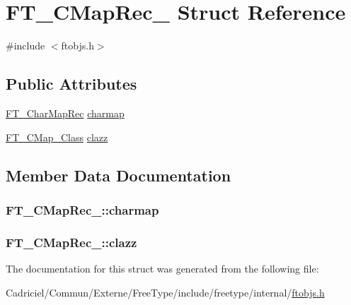 \hypertarget{struct_f_t___c_map_rec__}{\section{F\-T\-\_\-\-C\-Map\-Rec\-\_\- Struct Reference}
\label{struct_f_t___c_map_rec__}
}


{\ttfamily \#include $<$ftobjs.\-h$>$}

\subsection*{Public Attributes}
\begin{DoxyCompactItemize}
\item 
\hyperlink{freetype_8h_ad92f7574a10b500314a39fc55aa7e9e8}{F\-T\-\_\-\-Char\-Map\-Rec} \hyperlink{struct_f_t___c_map_rec___a39fa6de9995d4ae4496b93e2b874b34e}{charmap}
\item 
\hyperlink{ftobjs_8h_af6ac93d072307dd61214e0d2b7c0e924}{F\-T\-\_\-\-C\-Map\-\_\-\-Class} \hyperlink{struct_f_t___c_map_rec___aa85db42650df0edb38f8af5887c0ac6a}{clazz}
\end{DoxyCompactItemize}


\subsection{Member Data Documentation}
\hypertarget{struct_f_t___c_map_rec___a39fa6de9995d4ae4496b93e2b874b34e}{
\subsubsection[{charmap}]{ F\-T\-\_\-\-C\-Map\-Rec\-\_\-\-::charmap}}\label{struct_f_t___c_map_rec___a39fa6de9995d4ae4496b93e2b874b34e}
\hypertarget{struct_f_t___c_map_rec___aa85db42650df0edb38f8af5887c0ac6a}{
\subsubsection[{clazz}]{ F\-T\-\_\-\-C\-Map\-Rec\-\_\-\-::clazz}}\label{struct_f_t___c_map_rec___aa85db42650df0edb38f8af5887c0ac6a}


The documentation for this struct was generated from the following file\-:\begin{DoxyCompactItemize}
\item 
Cadriciel/\-Commun/\-Externe/\-Free\-Type/include/freetype/internal/\hyperlink{ftobjs_8h}{ftobjs.\-h}\end{DoxyCompactItemize}
